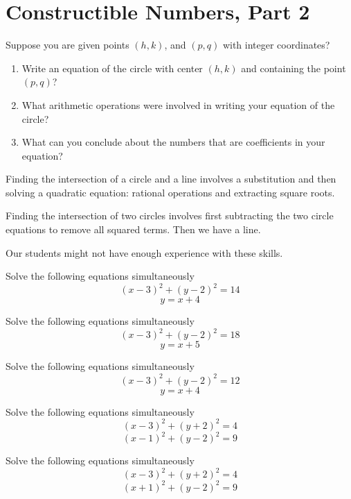 \newpage
\section{Constructible Numbers, Part 2}

\begin{prob}
Suppose you are given points $(h, k)$, and $(p, q)$ with integer coordinates?  
\begin{enumerate}
\item Write an equation of the circle with center $(h, k)$ and containing the point $(p, q)$?  
\item What arithmetic operations were involved in writing your equation of the circle?  
\item What can you conclude about the numbers that are coefficients in your equation?   
\end{enumerate}
\end{prob}

\begin{teachingnote}
Finding the intersection of a circle and a line involves a substitution and then solving a quadratic equation:  rational operations and extracting square roots.  

Finding the intersection of two circles involves first subtracting the two circle equations to remove all squared terms.  Then we have a line.  

Our students might not have enough experience with these skills.  
\end{teachingnote}

\begin{prob}
Solve the following equations simultaneously
$$(x-3)^2+(y-2)^2 = 14$$
$$ y = x + 4$$
\end{prob}


\begin{prob}
Solve the following equations simultaneously
$$(x-3)^2+(y-2)^2 = 18$$
$$ y = x + 5$$
\end{prob}

\begin{prob}
Solve the following equations simultaneously
$$(x-3)^2+(y-2)^2 = 12$$
$$ y = x + 4$$
\end{prob}


\begin{prob}
Solve the following equations simultaneously
$$(x-3)^2+(y+2)^2 = 4$$
$$(x-1)^2+(y-2)^2 = 9$$
\end{prob}

\begin{prob}
Solve the following equations simultaneously
$$(x-3)^2+(y+2)^2 = 4$$
$$(x+1)^2+(y-2)^2 = 9$$
\end{prob}


